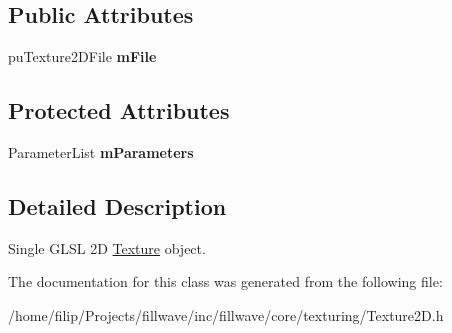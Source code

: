 \subsection*{Public Attributes}
\begin{DoxyCompactItemize}
\item 
\hypertarget{classfillwave_1_1core_1_1Texture2D_aece92ed6573863ec25f3fe1125543438}{}pu\+Texture2\+D\+File {\bfseries m\+File}\label{classfillwave_1_1core_1_1Texture2D_aece92ed6573863ec25f3fe1125543438}

\end{DoxyCompactItemize}
\subsection*{Protected Attributes}
\begin{DoxyCompactItemize}
\item 
\hypertarget{classfillwave_1_1core_1_1Texture2D_ab52b2ff805690f9320bdb05203e4752a}{}Parameter\+List {\bfseries m\+Parameters}\label{classfillwave_1_1core_1_1Texture2D_ab52b2ff805690f9320bdb05203e4752a}

\end{DoxyCompactItemize}


\subsection{Detailed Description}
Single G\+L\+S\+L 2\+D \hyperlink{classfillwave_1_1core_1_1Texture}{Texture} object. 

The documentation for this class was generated from the following file\+:\begin{DoxyCompactItemize}
\item 
/home/filip/\+Projects/fillwave/inc/fillwave/core/texturing/Texture2\+D.\+h\end{DoxyCompactItemize}
